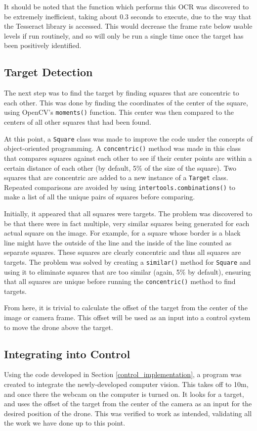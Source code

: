 \documentclass[11pt]{article}
\begin{document}
It should be noted that the function which performs this OCR was discovered to be extremely inefficient, taking about 0.3 seconds to execute, due to the way that the Tesseract library is accessed. This would decrease the frame rate below usable levels if run routinely, and so will only be run a single time once the target has been positively identified.

\subsection{Target Detection}
The next step was to find the target by finding squares that are concentric to each other. This was done by finding the coordinates of the center of the square, using OpenCV's \lstinline|moments()| function. This center was then compared to the centers of all other squares that had been found.

At this point, a \lstinline|Square| class was made to improve the code under the concepts of object-oriented programming. A \lstinline|concentric()| method was made in this class that compares squares against each other to see if their center points are within a certain distance of each other (by default, 5\% of the size of the square). Two squares that are concentric are added to a new instance of a \lstinline|Target| class. Repeated comparisons are avoided by using \lstinline|intertools.combinations()| to make a list of all the unique pairs of squares before comparing.

Initially, it appeared that all squares were targets. The problem was discovered to be that there were in fact multiple, very similar squares being generated for each actual square on the image. For example, for a square whose border is a black line might have the outside of the line and the inside of the line counted as separate squares. These squares are clearly concentric and thus all squares are targets. The problem was solved by creating a \lstinline|similar()| method for \lstinline|Square| and using it to eliminate squares that are too similar (again, 5\% by default), ensuring that all squares are unique before running the \lstinline|concentric()| method to find targets.

From here, it is trivial to calculate the offset of the target from the center of the image or camera frame. This offset will be used as an input into a control system to move the drone above the target.

\subsection{Integrating into Control}
Using the code developed in Section \ref{control_implementation}, a program was created to integrate the newly-developed computer vision. This takes off to 10m, and once there the webcam on the computer is turned on. It looks for a target, and uses the offset of the target from the center of the camera as an input for the desired position of the drone. This was verified to work as intended, validating all the work we have done up to this point.
\end{document}
